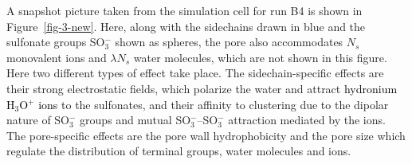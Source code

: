 \documentclass[3p,english,preprint]{elsarticle}
\newcommand{\need}[1]{\textcolor{black}{#1}}
\newcommand{\mage}[1]{\textcolor{black}{#1}}
\begin{document}
A snapshot picture taken  from the simulation cell %
for run B4 is shown in Figure~\ref{fig-3-new}. Here, 
along with the sidechains drawn in blue and the 
sulfonate groups SO$_3^-$ shown as spheres,  
 the pore also accommodates 
$N_s$ monovalent ions and $\lambda N_s$ water molecules, which are not shown 
 in this figure. 
Here two different types of effect take place. 
The sidechain-specific effects are  their strong electrostatic fields, which
polarize the water and attract  
{\need{ 
 hydronium H$_3$O$^+$ ions 
}}
 to the sulfonates, 
and their affinity to  clustering due to the dipolar nature of  SO$_3^-$ groups  and mutual
SO$_3^-$--SO$_3^-$ attraction mediated by the ions.  
The pore-specific effects are the pore wall hydrophobicity and the pore size which regulate
the distribution of terminal groups, water molecules  and ions. 
\end{document}
